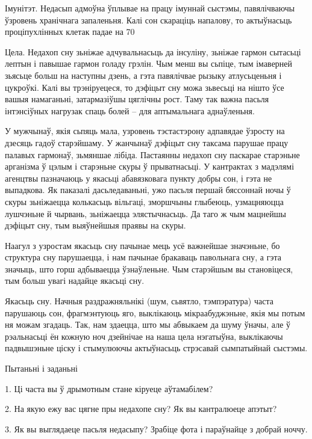 Імунітэт. Недасып адмоўна ўплывае на працу імуннай сыстэмы, павялічваючы ўзровень хранічнага запаленьня. Калі сон скараціць напалову, то актыўнасьць проціпухлінных клетак падае на 70%

Цела. Недахоп сну зьніжае адчувальнасьць да інсуліну, зьніжае гармон сытасьці лептын і павышае гармон голаду грэлін. Чым менш вы сьпіце, тым імаверней зьясьце больш на наступны дзень, а гэта павялічвае рызыку атлусьценьня і цукроўкі. Калі вы трэніруецеся, то дэфіцыт сну можа зьвесьці на нішто ўсе вашыя намаганьні, затармазіўшы цяглічны рост. Таму так важна пасьля інтэнсіўных нагрузак спаць болей – для аптымальнага аднаўленьня.

У мужчынаў, якія сьпяць мала, узровень тэстастэрону адпавядае ўзросту на дзесяць гадоў старэйшаму. У жанчынаў дэфіцыт сну таксама парушае працу палавых гармонаў, зьмяншае лібіда. Пастаянны недахоп сну паскарае старэньне арганізма ў цэлым і старэньне скуры ў прыватнасьці. У кантрактах з мадэлямі агенцтвы пазначаюць у якасьці абавязковага пункту добры сон, і гэта не выпадкова. Як паказалі дасьледаваньні, ужо пасьля першай бяссоннай ночы ў скуры зьніжаецца колькасьць вільгаці, зморшчыны глыбеюць, узмацняюцца лушчэньне й чырвань, зьніжаецца элястычнасьць. Да таго ж чым мацнейшы дэфіцыт сну, тым выяўнейшыя праявы на скуры.

Наагул з узростам якасьць сну пачынае мець усё важнейшае значэньне, бо структура сну парушаецца, і нам пачынае бракаваць павольнага сну, а гэта значыць, што горш адбываецца ўзнаўленьне. Чым старэйшым вы становіцеся, тым больш увагі надайце якасьці сну.

Якасьць сну. Начныя раздражняльнікі (шум, сьвятло, тэмпэратура) часта парушаюць сон, фрагмэнтуюць яго, выклікаюць мікраабуджэньне, якія мы потым ня можам згадаць. Так, нам здаецца, што мы абвыкаем да шуму ўначы, але ў рэальнасьці ён кожную ноч дзейнічае на наша цела нэгатыўна, выклікаючы падвышэньне ціску і стымулюючы актыўнасьць стрэсавай сымпатыйнай сыстэмы.

Пытаньні і заданьні

1. Ці часта вы ў дрымотным стане кіруеце аўтамабілем?

2. На якую ежу вас цягне пры недахопе сну? Як вы кантралюеце апэтыт?

3. Як вы выглядаеце пасьля недасыпу? Зрабіце фота і параўнайце з добрай ноччу.


